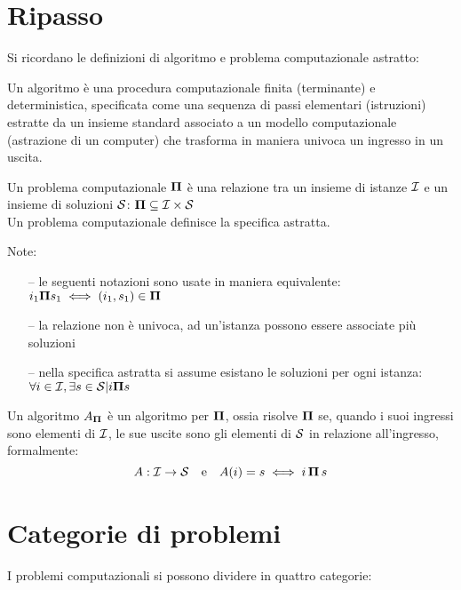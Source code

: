 \section{Ripasso}

Si ricordano le definizioni di algoritmo e problema computazionale astratto:

\begin{definition}[Algoritmo]\label{def:alg}
    Un algoritmo è una procedura computazionale finita (terminante) e deterministica, specificata come una sequenza di passi elementari (istruzioni) estratte da un insieme standard associato a un modello computazionale (astrazione di un computer) che trasforma in maniera univoca un ingresso in un uscita.
\end{definition}


\begin{definition}\label{def:probcomp}
    Un problema computazionale $\bm{\Pi}{}$ è una relazione tra un insieme di istanze $\mathcal{I}{}$ e un insieme di soluzioni $\mathcal{S}{}$: $\bm{\Pi}{} \subseteq \mathcal{I}{} \times \mathcal{S}{}$
    \\
    Un problema computazionale definisce la specifica astratta. %
\end{definition}

Note:
\begin{itemize}[noitemsep,parsep=0pt,partopsep=0pt,topsep=0pt]
    \item[--] le seguenti notazioni sono usate in maniera equivalente: $i_1 \bm{\Pi}{} s_1 \iff (i_1 , s_1 ) \in \bm{\Pi}{}$
    \item[--] la relazione non è univoca, ad un'istanza possono essere associate più soluzioni
    \item[--] nella specifica astratta si assume esistano le soluzioni per ogni istanza:\\
        $\forall i \in \mathcal{I}{},\exists s \in \mathcal{S}{} | i \bm{\Pi}{} s$
\end{itemize}

Un algoritmo $A_{\bm{\Pi}{}}$ è un algoritmo per $\bm{\Pi}{}$, ossia risolve $\bm{\Pi}{}$ se, quando i suoi ingressi sono elementi di $\mathcal{I}{}$, le sue uscite sono gli elementi di $\mathcal{S}{}$ in relazione all'ingresso, formalmente:
$$ A: \mathcal{I}{} \to \mathcal{S}{} \quad \textrm{e} \quad A(i)=s \iff i \, \bm{\Pi}{} \, s $$

\section{Categorie di problemi}
I problemi computazionali si possono dividere in quattro categorie:

